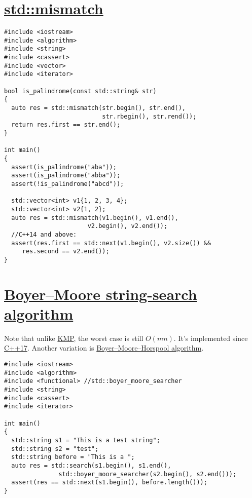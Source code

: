 \documentclass{book}
\begin{document}
	\section{\href{https://en.cppreference.com/w/cpp/algorithm/mismatch}{std::mismatch}}
	\begin{lstlisting}
#include <iostream>
#include <algorithm>
#include <string>
#include <cassert>
#include <vector>
#include <iterator>

bool is_palindrome(const std::string& str)
{
  auto res = std::mismatch(str.begin(), str.end(),
                           str.rbegin(), str.rend());
  return res.first == str.end();
}

int main()
{
  assert(is_palindrome("aba"));
  assert(is_palindrome("abba"));
  assert(!is_palindrome("abcd"));

  std::vector<int> v1{1, 2, 3, 4};
  std::vector<int> v2{1, 2};
  auto res = std::mismatch(v1.begin(), v1.end(),
	                   v2.begin(), v2.end());
  //C++14 and above:
  assert(res.first == std::next(v1.begin(), v2.size()) &&
	 res.second == v2.end());
}
	\end{lstlisting}
	\section{\href{https://en.cppreference.com/w/cpp/utility/functional/boyer_moore_searcher}{Boyer–Moore string-search algorithm}}
	Note that unlike \href{https://en.wikipedia.org/wiki/Knuth%E2%80%93Morris%E2%80%93Pratt_algorithm}{KMP}, the worst case is still $O(mn)$. It's implemented since \href{https://en.cppreference.com/w/cpp/utility/functional/boyer_moore_searcher}{C++17}. Another variation is \href{https://en.cppreference.com/w/cpp/utility/functional/boyer_moore_horspool_searcher}{Boyer–Moore–Horspool algorithm}.
	\begin{lstlisting}	
#include <iostream>
#include <algorithm>
#include <functional> //std::boyer_moore_searcher
#include <string>
#include <cassert>
#include <iterator>

int main()
{
  std::string s1 = "This is a test string";
  std::string s2 = "test";
  std::string before = "This is a ";
  auto res = std::search(s1.begin(), s1.end(),
               std::boyer_moore_searcher(s2.begin(), s2.end()));
  assert(res == std::next(s1.begin(), before.length()));
}
	\end{lstlisting}
\end{document}
